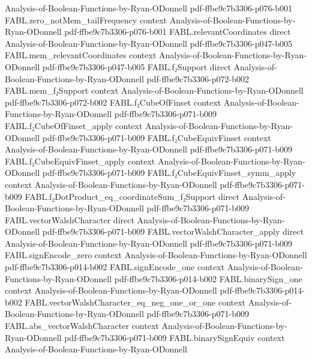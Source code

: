 \begin{theorem}
  {Analysis-of-Boolean-Functions-by-Ryan-ODonnell}
  {pdf-ffbe9c7b3306-p076-b001}
\proofstep
  {FABL.zero_notMem_tailFrequency}
  {context}
  {Analysis-of-Boolean-Functions-by-Ryan-ODonnell}
  {pdf-ffbe9c7b3306-p076-b001}
\proofstep
  {FABL.relevantCoordinates}
  {direct}
  {Analysis-of-Boolean-Functions-by-Ryan-ODonnell}
  {pdf-ffbe9c7b3306-p047-b005}
\proofstep
  {FABL.mem_relevantCoordinates}
  {context}
  {Analysis-of-Boolean-Functions-by-Ryan-ODonnell}
  {pdf-ffbe9c7b3306-p047-b005}
\proofstep
  {FABL.f₂Support}
  {direct}
  {Analysis-of-Boolean-Functions-by-Ryan-ODonnell}
  {pdf-ffbe9c7b3306-p072-b002}
\proofstep
  {FABL.mem_f₂Support}
  {context}
  {Analysis-of-Boolean-Functions-by-Ryan-ODonnell}
  {pdf-ffbe9c7b3306-p072-b002}
\proofstep
  {FABL.f₂CubeOfFinset}
  {context}
  {Analysis-of-Boolean-Functions-by-Ryan-ODonnell}
  {pdf-ffbe9c7b3306-p071-b009}
\proofstep
  {FABL.f₂CubeOfFinset_apply}
  {context}
  {Analysis-of-Boolean-Functions-by-Ryan-ODonnell}
  {pdf-ffbe9c7b3306-p071-b009}
\proofstep
  {FABL.f₂CubeEquivFinset}
  {context}
  {Analysis-of-Boolean-Functions-by-Ryan-ODonnell}
  {pdf-ffbe9c7b3306-p071-b009}
\proofstep
  {FABL.f₂CubeEquivFinset_apply}
  {context}
  {Analysis-of-Boolean-Functions-by-Ryan-ODonnell}
  {pdf-ffbe9c7b3306-p071-b009}
\proofstep
  {FABL.f₂CubeEquivFinset_symm_apply}
  {context}
  {Analysis-of-Boolean-Functions-by-Ryan-ODonnell}
  {pdf-ffbe9c7b3306-p071-b009}
\proofstep
  {FABL.f₂DotProduct_eq_coordinateSum_f₂Support}
  {direct}
  {Analysis-of-Boolean-Functions-by-Ryan-ODonnell}
  {pdf-ffbe9c7b3306-p071-b009}
\proofstep
  {FABL.vectorWalshCharacter}
  {direct}
  {Analysis-of-Boolean-Functions-by-Ryan-ODonnell}
  {pdf-ffbe9c7b3306-p071-b009}
\proofstep
  {FABL.vectorWalshCharacter_apply}
  {direct}
  {Analysis-of-Boolean-Functions-by-Ryan-ODonnell}
  {pdf-ffbe9c7b3306-p071-b009}
\proofstep
  {FABL.signEncode_zero}
  {context}
  {Analysis-of-Boolean-Functions-by-Ryan-ODonnell}
  {pdf-ffbe9c7b3306-p014-b002}
\proofstep
  {FABL.signEncode_one}
  {context}
  {Analysis-of-Boolean-Functions-by-Ryan-ODonnell}
  {pdf-ffbe9c7b3306-p014-b002}
\proofstep
  {FABL.binarySign_one}
  {context}
  {Analysis-of-Boolean-Functions-by-Ryan-ODonnell}
  {pdf-ffbe9c7b3306-p014-b002}
\proofstep
  {FABL.vectorWalshCharacter_eq_neg_one_or_one}
  {context}
  {Analysis-of-Boolean-Functions-by-Ryan-ODonnell}
  {pdf-ffbe9c7b3306-p071-b009}
\proofstep
  {FABL.abs_vectorWalshCharacter}
  {context}
  {Analysis-of-Boolean-Functions-by-Ryan-ODonnell}
  {pdf-ffbe9c7b3306-p071-b009}
\proofstep
  {FABL.binarySignEquiv}
  {context}
  {Analysis-of-Boolean-Functions-by-Ryan-ODonnell}

\end{theorem}
